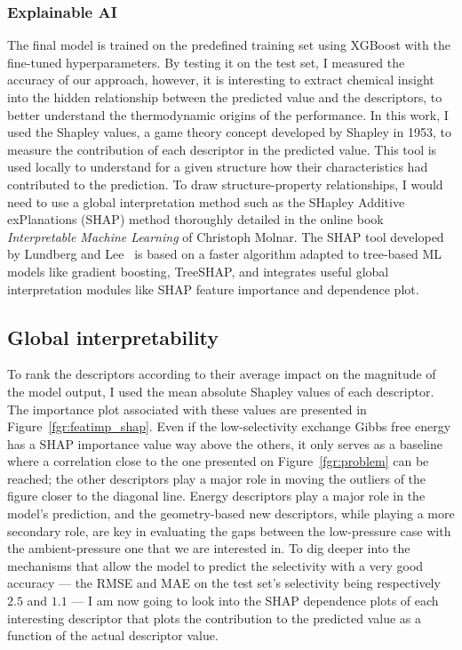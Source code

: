 \documentclass[main]{subfiles}
\begin{document}
\subsubsection{Explainable AI}

The final model is trained on the predefined training set using XGBoost with the fine-tuned hyperparameters. By testing it on the test set, I measured the accuracy of our approach, however, it is interesting to extract chemical insight into the hidden relationship between the predicted value and the descriptors, to better understand the thermodynamic origins of the performance. In this work, I used the Shapley values,\autocite{shapley1953value} a game theory concept developed by Shapley in 1953, to measure the contribution of each descriptor in the predicted value. This tool is used locally to understand for a given structure how their characteristics had contributed to the prediction. To draw structure-property relationships, I would need to use a global interpretation method such as the SHapley Additive exPlanations (SHAP) method thoroughly detailed in the online book \emph{Interpretable Machine Learning} of Christoph Molnar.\autocite{molnar2020interpretable} The SHAP tool developed by Lundberg and Lee~\autocite{SHAP} is based on a faster algorithm adapted to tree-based ML models like gradient boosting, TreeSHAP, and integrates useful global interpretation modules like SHAP feature importance and dependence plot.

\subsection{Global interpretability}

To rank the descriptors according to their average impact on the magnitude of the model output, I used the mean absolute Shapley values of each descriptor. The importance plot associated with these values are presented in Figure~\ref{fgr:featimp_shap}. Even if the low-selectivity exchange Gibbs free energy has a SHAP importance value way above the others, it only serves as a baseline where a correlation close to the one presented on Figure~\ref{fgr:problem} can be reached; the other descriptors play a major role in moving the outliers of the figure closer to the diagonal line. Energy descriptors play a major role in the model's prediction, and the geometry-based new descriptors, while playing a more secondary role, are key in evaluating the gaps between the low-pressure case with the ambient-pressure one that we are interested in. To dig deeper into the mechanisms that allow the model to predict the selectivity with a very good accuracy --- the RMSE and MAE on the test set's selectivity being respectively $2.5$ and $1.1$ --- I am now going to look into the SHAP dependence plots of each interesting descriptor that plots the contribution to the predicted value as a function of the actual descriptor value.
\end{document}

